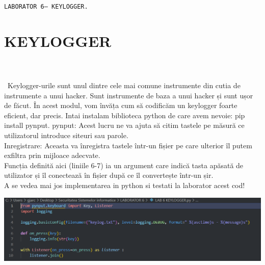 \documentclass[oneside,20pt]{article}          %
\begin{document}

\noindent 
\begin{center}
  \texttt{LABORATOR 6-- KEYLOGGER.}        
\end{center}

\section{KEYLOGGER}
\noindent                 
\\\\\
Keylogger-urile sunt unul dintre cele mai comune instrumente din cutia de instrumente a unui hacker. Sunt instrumente de baza a unui hacker și sunt ușor de făcut. În acest modul, vom învăța cum să codificăm un keylogger foarte eficient, dar precis.  Intai instalam biblioteca python de care avem nevoie: pip install pynput.
pynput: Acest lucru ne va ajuta să citim tastele pe măsură ce utilizatorul introduce siteuri sau parole.\\
Inregistrare: Aceasta va înregistra tastele într-un fișier pe care ulterior îl putem exfiltra prin mijloace adecvate.\\
Funcția definită aici (liniile 6-7) ia un argument care indică tasta apăsată de utilizator și îl conectează în fișier după ce îl convertește într-un șir.\\
A se vedea mai jos implementarea in python si testati la laborator acest cod!
\begin{center}
\includegraphics[height=3 cm]{1.png}
\end{center}
\end{document}
